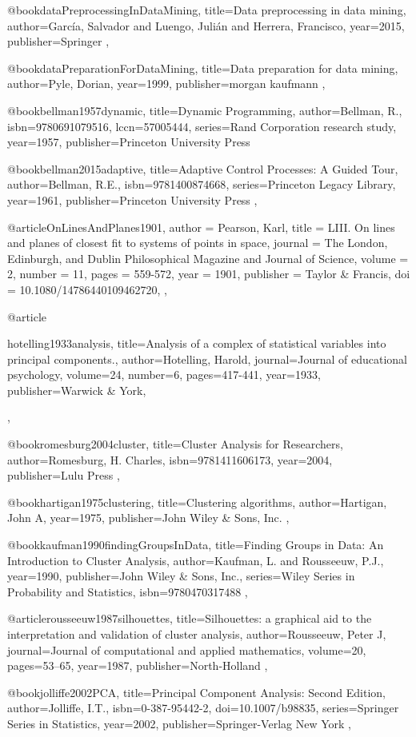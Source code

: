 @book{dataPreprocessingInDataMining,
  title={Data preprocessing in data mining},
  author={García, Salvador and Luengo, Julián and Herrera, Francisco},
  year={2015},
  publisher={Springer}
},

@book{dataPreparationForDataMining,
  title={Data preparation for data mining},
  author={Pyle, Dorian},
  year={1999},
  publisher={morgan kaufmann}
},

@book{bellman1957dynamic,
  title={Dynamic Programming},
  author={Bellman, R.},
  isbn={9780691079516},
  lccn={57005444},
  series={Rand Corporation research study},
  year={1957},
  publisher={Princeton University Press}
}

@book{bellman2015adaptive,
  title={Adaptive Control Processes: A Guided Tour},
  author={Bellman, R.E.},
  isbn={9781400874668},
  series={Princeton Legacy Library},
  year={1961},
  publisher={Princeton University Press}
},

@article{OnLinesAndPlanes1901,
author = {Pearson, Karl},
title = {LIII. On lines and planes of closest fit to systems of points in space},
journal = {The London, Edinburgh, and Dublin Philosophical Magazine and Journal of Science},
volume = {2},
number = {11},
pages = {559-572},
year  = {1901},
publisher = {Taylor & Francis},
doi = {10.1080/14786440109462720},
},

@article{hotelling1933analysis,
  title={Analysis of a complex of statistical variables into principal components.},
  author={Hotelling, Harold},
  journal={Journal of educational psychology},
  volume={24},
  number={6},
  pages={417-441},
  year={1933},
  publisher={Warwick \& York},

},

@book{romesburg2004cluster,
  title={Cluster Analysis for Researchers},
  author={Romesburg, H. Charles},
  isbn={9781411606173},
  year={2004},
  publisher={Lulu Press}
},

@book{hartigan1975clustering,
  title={Clustering algorithms},
  author={Hartigan, John A},
  year={1975},
  publisher={John Wiley \& Sons, Inc.}
},

@book{kaufman1990findingGroupsInData,
  title={Finding Groups in Data: An Introduction to Cluster Analysis},
  author={Kaufman, L. and Rousseeuw, P.J.},
  year={1990},
  publisher={John Wiley \& Sons, Inc.},
  series={Wiley Series in Probability and Statistics},
  isbn={9780470317488}
},

@article{rousseeuw1987silhouettes,
  title={Silhouettes: a graphical aid to the interpretation and validation of cluster analysis},
  author={Rousseeuw, Peter J},
  journal={Journal of computational and applied mathematics},
  volume={20},
  pages={53--65},
  year={1987},
  publisher={North-Holland}
},

@book{jolliffe2002PCA,
  title={Principal Component Analysis: Second Edition},
  author={Jolliffe, I.T.},
  isbn={0-387-95442-2},
  doi={10.1007/b98835},
  series={Springer Series in Statistics},
  year={2002},
  publisher={Springer-Verlag New York}
},